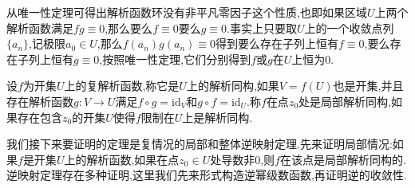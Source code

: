从唯一性定理可得出解析函数环没有非平凡零因子这个性质,也即如果区域$U$上两个解析函数满足$fg\equiv0$,那么要么$f\equiv0$要么$g\equiv0$.事实上只要取$U$上的一个收敛点列$\{a_n\}$,记极限$a_0\in U$,那么$f(a_n)g(a_n)\equiv0$得到要么存在子列上恒有$f\equiv0$,要么存在子列上恒有$g\equiv0$,按照唯一性定理,它们分别得到$f$或$g$在$U$上恒为0.

设$f$为开集$U$上的复解析函数,称它是$U$上的解析同构,如果$V=f(U)$也是开集,并且存在解析函数$g:V\to U$满足$f\circ g=\mathrm{id}_V$和$g\circ f=\mathrm{id}_U$.称$f$在点$z_0$处是局部解析同构,如果存在包含$z_0$的开集$U$使得$f$限制在$U$上是解析同构.

我们接下来要证明的定理是复情况的局部和整体逆映射定理.先来证明局部情况:如果$f$是开集$U$上的解析函数,如果在点$z_0\in U$处导数非0,则$f$在该点是局部解析同构的.逆映射定理存在多种证明,这里我们先来形式构造逆幂级数函数,再证明逆的收敛性.

